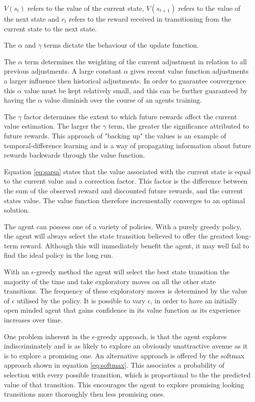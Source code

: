 \documentclass{rucsthesis}
\begin{document}
$V(s_t)$ refers to the value of the current state, $V(s_{t+1})$ refers to the value of the next state and $r_t$ refers to the reward received in transitioning from the current state to the next state. 

The $\alpha$ and $\gamma$ terms dictate the behaviour of the update function. 

The $\alpha$ term determines the weighting of the current adjustment in relation to all previous adjustments. A large constant $\alpha$ gives recent value function adjustments a larger influence then historical adjustments. In order to guarantee convergence this $\alpha$ value must be kept relatively small, and this can be further guaranteed by having the $\alpha$ value diminish over the course of an agents training. 

The $\gamma$ factor determines the extent to which future rewards affect the current value estimation. The larger the $\gamma$ term, the greater the significance attributed to future rewards. This approach of "backing up" the values is an example of temporal-difference learning\citep{suttonbarto} and is a way of propagating information about future rewards backwards through the value function.

Equation \ref{eq:sarsa} states that the value associated with the current state is equal to the current value and a correction factor. This factor is the difference between the sum of the observed reward and discounted future rewards, and the current states value. The value function therefore incrementally converges to an optimal solution.

The agent can possess one of a variety of policies. With a purely greedy policy, the agent will always select the state transition believed to offer the greatest long-term reward. Although this will immediately benefit the agent, it may well fail to find the ideal policy in the long run. 

With an $\epsilon$-greedy method the agent will select the best state transition the majority of the time and take exploratory moves on all the other state transitions. The frequency of these exploratory moves is determined by the value of $\epsilon$ utilised by the policy. It is possible to vary $\epsilon$, in order to have an initially open minded agent that gains confidence in its value function as its experience increases over time. 

One problem inherent in the $\epsilon$-greedy approach, is that the agent explores indiscriminately and is as likely to explore an obviously unattractive avenue as it is to explore a promising one. An alternative approach is offered by the softmax approach shown in equation \ref{eq:softmax}. This associates a probability of selection with every possible transition, which is proportional to the the predicted value of that transition. This encourages the agent to explore promising looking transitions more thoroughly then less promising ones.
\end{document}
